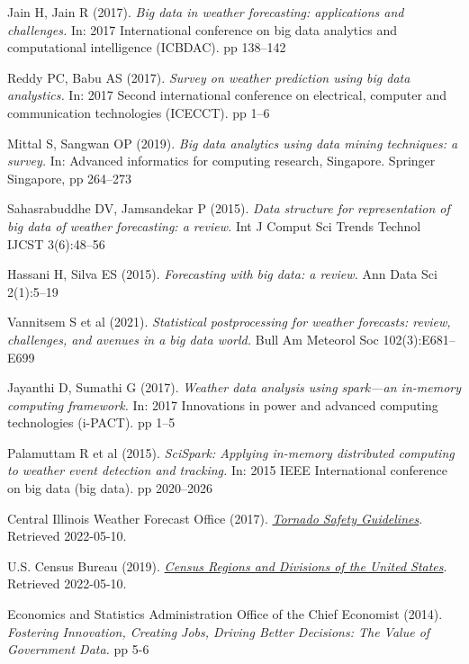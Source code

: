 \documentclass[conference]{IEEEtran}
\begin{document}
\begin{thebibliography}{9}

Jain H, Jain R (2017). \textit{Big data in weather forecasting: applications and challenges.} In: 2017 International conference on big data analytics and computational intelligence (ICBDAC). pp 138–142

Reddy PC, Babu AS (2017). \textit{Survey on weather prediction using big data analystics.} In: 2017 Second international conference on electrical, computer and communication technologies (ICECCT). pp 1–6

Mittal S, Sangwan OP (2019). \textit{Big data analytics using data mining techniques: a survey.} In: Advanced informatics for computing research, Singapore. Springer Singapore, pp 264–273

Sahasrabuddhe DV, Jamsandekar P (2015). \textit{Data structure for representation of big data of weather forecasting: a review.} Int J Comput Sci Trends Technol IJCST 3(6):48–56

Hassani H, Silva ES (2015). \textit{Forecasting with big data: a review.} Ann Data Sci 2(1):5–19

Vannitsem S et al (2021). \textit{Statistical postprocessing for weather forecasts: review, challenges, and avenues in a big data world.} Bull Am Meteorol Soc 102(3):E681–E699

Jayanthi D, Sumathi G (2017). \textit{Weather data analysis using spark—an in-memory computing framework.} In: 2017 Innovations in power and advanced computing technologies (i-PACT). pp 1–5

Palamuttam R et al (2015). \textit{SciSpark: Applying in-memory distributed computing to weather event detection and tracking.} In: 2015 IEEE International conference on big data (big data). pp 2020–2026

Central Illinois Weather Forecast Office (2017). \href{https://www.weather.gov/ilx/SvrPrepWeek-Tuesday}{\textit{Tornado Safety Guidelines}}. Retrieved 2022-05-10.

U.S. Census Bureau (2019). \href{https://www2.census.gov/geo/pdfs/maps-data/maps/reference/us\_regdiv.pdf}{\textit{Census Regions and Divisions of the United States}}. Retrieved 2022-05-10.

Economics and Statistics Administration Office of the Chief Economist (2014). \textit{Fostering Innovation, Creating Jobs, Driving Better Decisions: The Value of Government Data.} pp 5-6


\end{thebibliography}
\end{document}
